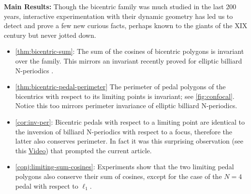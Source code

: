 
\textbf{Main Results:}
Though the bicentric family was much studied in the last 200 years, interactive experimentation with their dynamic geometry has led us to detect and prove a few new curious facts, perhaps known to the giants of the XIX century but never jotted down.

\begin{itemize}
    \item \cref{thm:bicentric-sum}: The sum of the cosines of bicentric polygons is invariant over the family. This mirrors an invariant recently proved for elliptic billiard N-periodics \cite{reznik2020-intelligencer,garcia2020-new-properties,akopyan2020-invariants,bialy2020-invariants}.
    \item  \cref{thm:bicentric-pedal-perimeter} The perimeter of pedal polygons of the bicentrics with respect to its limiting points is invariant; see \cref{fig:confocal}. Notice this too mirrors perimeter invariance of elliptic billiard N-periodics.
    \item \cref{cor:inv-per}: Bicentric pedals with respect to a limiting point are identical to the inversion of billiard N-periodics with respect to a focus, therefore the latter also conserves perimeter. In fact it was this surprising observation (see this \href{https://youtu.be/wkstGKq5jOo}{Video}) that prompted the current article.
    \item \cref{conj:limiting-sum-cosines}: Experiments show that the two limiting pedal polygons also conserve their sum of cosines, except for  the case of the $N=4$ pedal with respect to $\ell_1$.
\end{itemize}




